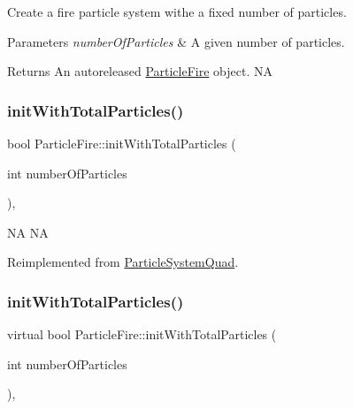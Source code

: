 Create a fire particle system withe a fixed number of particles.


\begin{DoxyParams}{Parameters}
{\em number\+Of\+Particles} & A given number of particles. \\
\hline
\end{DoxyParams}
\begin{DoxyReturn}{Returns}
An autoreleased \hyperlink{classParticleFire}{Particle\+Fire} object.  NA 
\end{DoxyReturn}
\mbox{\label{classParticleFire_ab4b3cbab1f857c1daa2219d47cca99c6}} 
\subsubsection{\texorpdfstring{init\+With\+Total\+Particles()}{initWithTotalParticles()}\hspace{0.1cm}{\footnotesize\ttfamily [1/2]}}
{\footnotesize\ttfamily bool Particle\+Fire\+::init\+With\+Total\+Particles (\begin{DoxyParamCaption}\item[{int}]{number\+Of\+Particles }\end{DoxyParamCaption})\hspace{0.3cm}{\ttfamily [override]}, {\ttfamily [virtual]}}

NA  NA 

Reimplemented from \hyperlink{classParticleSystemQuad_ae5420007b57e909c05e7476a54fbfbe9}{Particle\+System\+Quad}.

\mbox{\label{classParticleFire_a53432d0164422be9fb4bc1ef2394144c}} 
\subsubsection{\texorpdfstring{init\+With\+Total\+Particles()}{initWithTotalParticles()}\hspace{0.1cm}{\footnotesize\ttfamily [2/2]}}
{\footnotesize\ttfamily virtual bool Particle\+Fire\+::init\+With\+Total\+Particles (\begin{DoxyParamCaption}\item[{int}]{number\+Of\+Particles }\end{DoxyParamCaption})\hspace{0.3cm}{\ttfamily [override]}, {\ttfamily [virtual]}}


